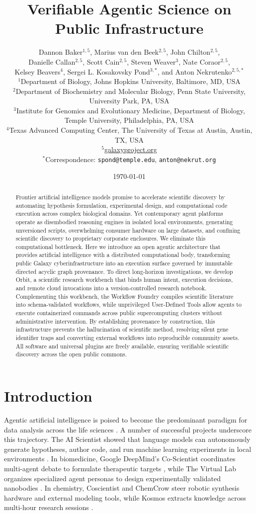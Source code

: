 \documentclass[11pt,letterpaper]{article}
\title{\textbf{Verifiable Agentic Science on Public Infrastructure}}
\author{
  Dannon Baker$^{1,5}$, Marius van den Beek$^{2,5}$, John Chilton$^{2,5}$,\\
  Danielle Callan$^{2,5}$, Scott Cain$^{2,5}$, Steven Weaver$^{3}$, Nate Coraor$^{2,5}$,\\
  Kelsey Beavers$^{4}$, Sergei L. Kosakovsky Pond$^{3,*}$, and Anton Nekrutenko$^{2,5,*}$\\[0.8em]
  \small $^{1}$Department of Biology, Johns Hopkins University, Baltimore, MD, USA\\
  \small $^{2}$Department of Biochemistry and Molecular Biology, Penn State University, University Park, PA, USA\\
  \small $^{3}$Institute for Genomics and Evolutionary Medicine, Department of Biology,\\
  \small Temple University, Philadelphia, PA, USA\\
  \small $^{4}$Texas Advanced Computing Center, The University of Texas at Austin, Austin, TX, USA\\
  \small $^{5}$\href{https://galaxyproject.org}{galaxyproject.org}\\[0.3em]
  \small $^{*}$Correspondence: \texttt{spond@temple.edu}, \texttt{anton@nekrut.org}
}
\date{\today}
\begin{document}
\maketitle

\begin{abstract}
Frontier artificial intelligence models promise to accelerate scientific discovery by automating hypothesis formulation, experimental design, and computational code execution across complex biological domains. Yet contemporary agent platforms operate as disembodied reasoning engines in isolated local environments, generating unversioned scripts, overwhelming consumer hardware on large datasets, and confining scientific discovery to proprietary corporate enclosures. We eliminate this computational bottleneck. Here we introduce an open agentic architecture that provides artificial intelligence with a distributed computational body, transforming public Galaxy cyberinfrastructure into an execution surface governed by immutable directed acyclic graph provenance. To direct long-horizon investigations, we develop Orbit, a scientific research workbench that binds human intent, execution decisions, and remote cloud invocations into a version-controlled research notebook. Complementing this workbench, the Workflow Foundry compiles scientific literature into schema-validated workflows, while unprivileged User-Defined Tools allow agents to execute containerized commands across public supercomputing clusters without administrative intervention. By establishing provenance by construction, this infrastructure prevents the hallucination of scientific method, resolving silent gene identifier traps and converting external workflows into reproducible community assets. All software and universal plugins are freely available, ensuring verifiable scientific discovery across the open public commons.
\end{abstract}

\section{Introduction}

Agentic artificial intelligence is poised to become the predominant paradigm for data analysis across the life sciences \cite{biocoder2024}. A number of successful projects underscore this trajectory. The AI Scientist showed that language models can autonomously generate hypotheses, author code, and run machine learning experiments in local environments \cite{aiscientist2024}. In biomedicine, Google DeepMind's Co-Scientist coordinates multi-agent debate to formulate therapeutic targets \cite{coscientist2026}, while The Virtual Lab organizes specialized agent personas to design experimentally validated nanobodies \cite{virtuallab2025}. In chemistry, Coscientist \cite{boiko2023} and ChemCrow \cite{chemcrow2024} steer robotic synthesis hardware and external modeling tools, while Kosmos extracts knowledge across multi-hour research sessions \cite{kosmos2025}. 
\end{document}
